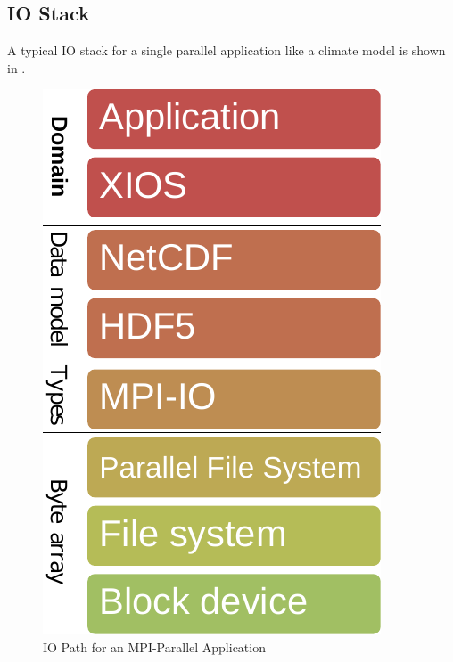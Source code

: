 \documentclass[a4paper]{article}
\begin{document}
{{\subsection{IO Stack}

A typical IO stack for a single parallel application like a climate model is shown in .

\begin{minipage}{0.2\textwidth}
\begin{figure}[H]
  \includegraphics[width=\textwidth]{layers-xios}
  \caption{IO Path for an MPI-Parallel Application}
  \label{fig:layers}
\end{figure}
\end{minipage}
}}
\end{document}
